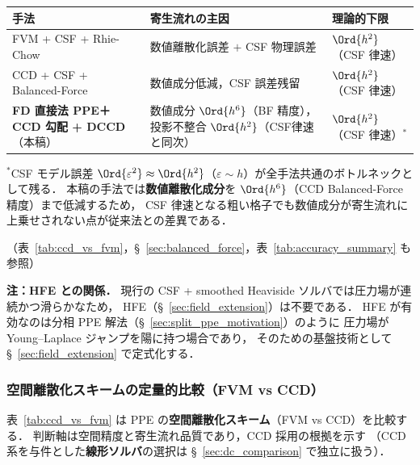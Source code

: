 \begin{tcolorbox}[resultbox, title={CCD Balanced-Force による寄生流れ抑制（FVM + CSF との比較）}]
\begin{center}
\small
\renewcommand{\arraystretch}{1.3}
\begin{tabular}{p{4.2cm}p{4.8cm}p{3.2cm}}
\hline
手法 & 寄生流れの主因 & 理論的下限 \\
\hline
FVM + CSF + Rhie-Chow & 数値離散化誤差 $+$ CSF 物理誤差 & $\Ord{h^2}$（CSF 律速） \\
CCD + CSF + Balanced-Force & 数値成分低減，CSF 誤差残留 & $\Ord{h^2}$（CSF 律速） \\
\textbf{FD 直接法 PPE＋CCD 勾配 + DCCD}（本稿） & 数値成分 $\Ord{h^6}$（BF 精度），投影不整合 $\Ord{h^2}$（CSF律速と同次） & $\Ord{h^2}$（CSF 律速）${}^{*}$ \\
\hline
\end{tabular}
\end{center}
${}^{*}$CSF モデル誤差 $\Ord{\varepsilon^2}\approx\Ord{h^2}$（$\varepsilon\sim h$）が全手法共通のボトルネックとして残る．
本稿の手法では\textbf{数値離散化成分}を $\Ord{h^6}$（CCD Balanced-Force 精度）まで低減するため，
CSF 律速となる粗い格子でも数値成分が寄生流れに上乗せされない点が従来法との差異である．

\smallskip
（表~\ref{tab:ccd_vs_fvm}，§~\ref{sec:balanced_force}，表~\ref{tab:accuracy_summary} も参照）

\smallskip\noindent\textbf{注：HFE との関係．}
現行の CSF + smoothed Heaviside ソルバでは圧力場が連続かつ滑らかなため，
HFE（§~\ref{sec:field_extension}）は不要である．
HFE が有効なのは分相 PPE 解法（§~\ref{sec:split_ppe_motivation}）のように
圧力場が Young--Laplace ジャンプを陽に持つ場合であり，
そのための基盤技術として §~\ref{sec:field_extension} で定式化する．
\end{tcolorbox}

\subsubsection{空間離散化スキームの定量的比較（FVM vs CCD）}
\label{sec:ccd_vs_fvm}

表~\ref{tab:ccd_vs_fvm} は PPE の\textbf{空間離散化スキーム}（FVM vs CCD）を比較する．
判断軸は空間精度と寄生流れ品質であり，CCD 採用の根拠を示す
（CCD 系を与件とした\textbf{線形ソルバ}の選択は §~\ref{sec:dc_comparison} で独立に扱う）．

